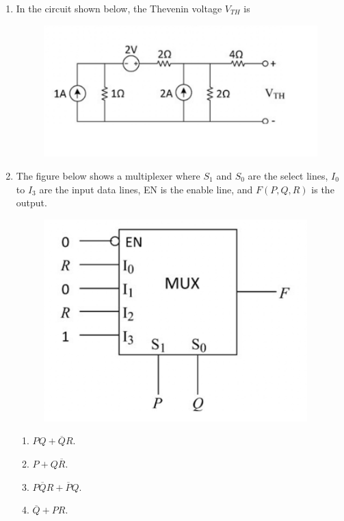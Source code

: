 \documentclass[a4paper, 11pt]{article}
\begin{document}
\begin{enumerate}
    \item In the circuit shown below, the Thevenin voltage $V_{TH}$ is
    \begin{figure}[H]
        \centering
        \includegraphics[width=0.5\columnwidth]{figs/Q9.png}
        \caption*{}
        \label{fig:q19}
    \end{figure}
    \begin{enumerate}
    \end{enumerate}

    \hfill{}

    \item The figure below shows a multiplexer where $S_1$ and $S_0$ are the select lines, $I_0$ to $I_3$ are the input data lines, EN is the enable line, and $F(P,Q,R)$ is the output.
    \begin{figure}[H]
        \centering
        \includegraphics[width=0.4\columnwidth]{figs/Q10.png}
        \caption*{}
        \label{fig:q20}
    \end{figure}
    \begin{enumerate}
        \item $PQ+\overline{Q}R.$
        \item $P+Q\overline{R}.$
        \item $P\overline{Q}R+\overline{P}Q.$
        \item $\overline{Q}+PR.$
    \end{enumerate}


\end{enumerate}
\end{document}

